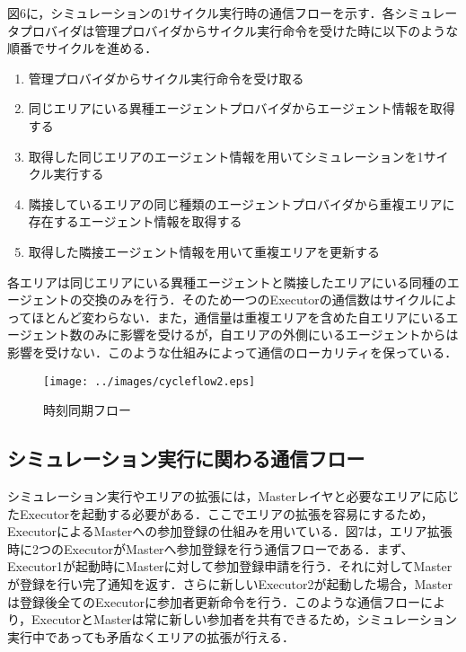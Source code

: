 \documentclass[originalpaper]{jsaiart}     %
\begin{document}
図6に，シミュレーションの1サイクル実行時の通信フローを示す．各シミュレータプロバイダは管理プロバイダからサイクル実行命令を受けた時に以下のような順番でサイクルを進める．

\begin{enumerate}
    \item 管理プロバイダからサイクル実行命令を受け取る
    \item 同じエリアにいる異種エージェントプロバイダからエージェント情報を取得する
    \item 取得した同じエリアのエージェント情報を用いてシミュレーションを1サイクル実行する
    \item 隣接しているエリアの同じ種類のエージェントプロバイダから重複エリアに存在するエージェント情報を取得する
    \item 取得した隣接エージェント情報を用いて重複エリアを更新する
 \end{enumerate}




 各エリアは同じエリアにいる異種エージェントと隣接したエリアにいる同種のエージェントの交換のみを行う．そのため一つのExecutorの通信数はサイクルによってほとんど変わらない．また，通信量は重複エリアを含めた自エリアにいるエージェント数のみに影響を受けるが，自エリアの外側にいるエージェントからは影響を受けない．このような仕組みによって通信のローカリティを保っている．


\begin{figure}[t]
    \begin{center}
        \texttt{[image: ../images/cycleflow2.eps]}
    \end{center}
    \caption{時刻同期フロー}
    \label{dummy}
\end{figure}

\subsection{シミュレーション実行に関わる通信フロー}
シミュレーション実行やエリアの拡張には，Masterレイヤと必要なエリアに応じたExecutorを起動する必要がある．ここでエリアの拡張を容易にするため，ExecutorによるMasterへの参加登録の仕組みを用いている．図7は，エリア拡張時に2つのExecutorがMasterへ参加登録を行う通信フローである．まず、Executor1が起動時にMasterに対して参加登録申請を行う．それに対してMasterが登録を行い完了通知を返す．さらに新しいExecutor2が起動した場合，Masterは登録後全てのExecutorに参加者更新命令を行う．このような通信フローにより，ExecutorとMasterは常に新しい参加者を共有できるため，シミュレーション実行中であっても矛盾なくエリアの拡張が行える．
\end{document}
